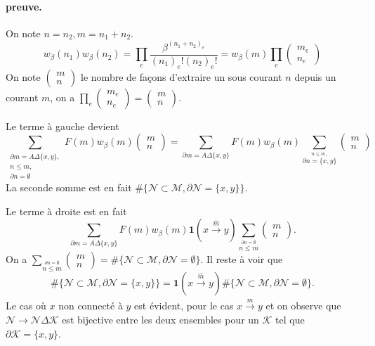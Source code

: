 \documentclass[a4paper,12pt]{report}
\begin{document}
\paragraph{preuve.} On note $n = n_2, m = n_1+n_2$.
$$w_\beta(n_1)w_\beta(n_2) = \prod_{e}\frac{\beta^{(n_1+n_2)_e}}{(n_1)_e!(n_2)_e!} = w_\beta(m) \prod_e\left(\begin{array}{c} m_e \\ n_e \end{array} \right)
$$
On note $\left(\begin{array}{c} m \\ n \end{array} \right)$ le nombre de façons d'extraire un sous courant $n$ depuis un courant $m$, on a $\prod_e\left(\begin{array}{c} m_e \\ n_e \end{array} \right) = \left(\begin{array}{c} m \\ n \end{array} \right)$.

Le terme à gauche devient $$
\sum_{\begin{array}{c}
\partial m = A\Delta\{x,y\},\\
n\leqslant m, \\
\partial n = \emptyset
\end{array}} F(m)w_\beta(m) \left(\begin{array}{c} m \\ n
\end{array} \right)= \sum_{\partial m = A\Delta\{x,y\}}F(m)w_\beta(m)\sum_{\overset{n\leqslant m,}{\partial n = \{x,y\}}}\left(\begin{array}{c} m \\ n
\end{array} \right)
$$
La seconde somme est en fait $\#\big\{ \mathcal{N}\subset \mathcal{M},\partial \mathcal{N} = \{x,y\}\big\}$.

Le terme à droite est en fait $$
\sum_{\partial m = A \Delta \{x,y\}} F(m)w_\beta(m)\mathbf{1}(x\overset{\hat{m}}{\longrightarrow}y)\sum_{\overset{\partial n = \emptyset}{n \leqslant m}}\left(\begin{array}{c} m \\ n \end{array} \right).
$$
On a $\displaystyle\sum_{\overset{\partial n = \emptyset}{n \leqslant m}}\left(\begin{array}{c} m \\ n \end{array} \right) = \#\{\mathcal{N}\subset \mathcal{M}, \partial \mathcal{N} = \emptyset\}$.
Il reste à voir que  $$\#\big\{ \mathcal{N}\subset \mathcal{M},\partial \mathcal{N} = \{x,y\}\big\} = \mathbf{1}(x\overset{\hat{m}}{\longrightarrow}y)\#\{\mathcal{N}\subset \mathcal{M}, \partial \mathcal{N} = \emptyset\}.$$
Le cas où $x$ non connecté à $y$ est évident, pour le cas $x\overset{\hat{m}}{\rightarrow}y$ et on observe que $\mathcal{N} \longrightarrow \mathcal{N}\Delta\mathcal{K}$ est bijective entre les deux ensembles pour un $\mathcal{K}$ tel que $\partial \mathcal{K} = \{x,y\}$.
\end{document}
